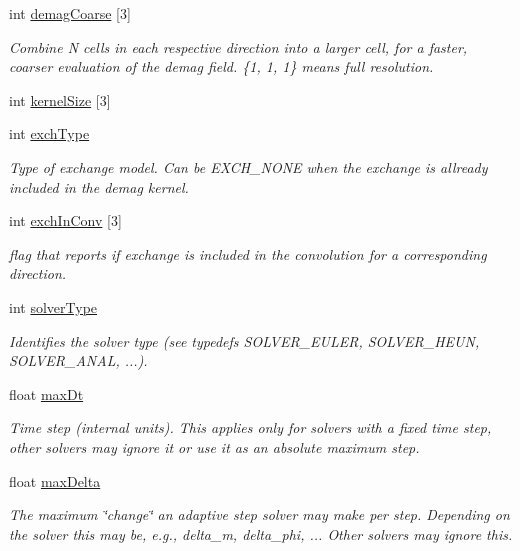 \begin{DoxyCompactItemize}
int \hyperlink{structparam_acb7eede771afb6d638df885f9ac67701}{demagCoarse} \mbox{[}3\mbox{]}
\begin{DoxyCompactList}\small\item\em Combine N cells in each respective direction into a larger cell, for a faster, coarser evaluation of the demag field. \{1, 1, 1\} means full resolution. \item\end{DoxyCompactList}\item 
int \hyperlink{structparam_ab4fe619208b39b35428e7de8c688ebd3}{kernelSize} \mbox{[}3\mbox{]}
\item 
int \hyperlink{structparam_a7274904db5b3421e22e323af7d1d7563}{exchType}
\begin{DoxyCompactList}\small\item\em Type of exchange model. Can be EXCH\_\-NONE when the exchange is allready included in the demag kernel. \item\end{DoxyCompactList}\item 
int \hyperlink{structparam_a557e842de84dc1a97295b1fa53700ec7}{exchInConv} \mbox{[}3\mbox{]}
\begin{DoxyCompactList}\small\item\em flag that reports if exchange is included in the convolution for a corresponding direction. \item\end{DoxyCompactList}\item 
int \hyperlink{structparam_af6bc102637a024c481ffe84088917c31}{solverType}
\begin{DoxyCompactList}\small\item\em Identifies the solver type (see typedefs SOLVER\_\-EULER, SOLVER\_\-HEUN, SOLVER\_\-ANAL, ...). \item\end{DoxyCompactList}\item 
float \hyperlink{structparam_a559b1aeda3483e4c736d422c529bd079}{maxDt}
\begin{DoxyCompactList}\small\item\em Time step (internal units). This applies only for solvers with a fixed time step, other solvers may ignore it or use it as an absolute maximum step. \item\end{DoxyCompactList}\item 
float \hyperlink{structparam_a4f60625c00da893f8501e8d449e9c92c}{maxDelta}
\begin{DoxyCompactList}\small\item\em The maximum \char`\"{}change\char`\"{} an adaptive step solver may make per step. Depending on the solver this may be, e.g., delta\_\-m, delta\_\-phi, ... Other solvers may ignore this. \item\end{DoxyCompactList}\item 

\end{DoxyCompactItemize}
